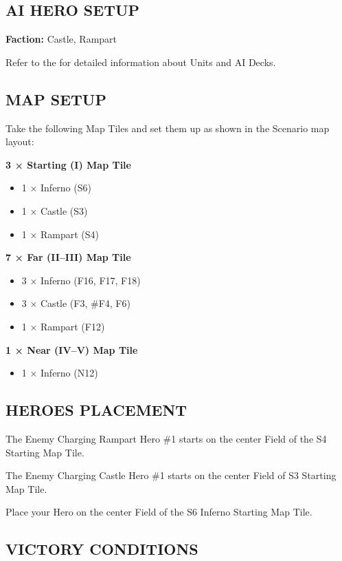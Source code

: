 \begin{multicols}{2}
\subsection*{\MakeUppercase{AI Hero Setup}}

\textbf{Faction:} Castle, Rampart

Refer to the  for detailed information about Units and AI Decks.

\subsection*{\MakeUppercase{Map Setup}}

Take the following Map Tiles and set them up as shown in the Scenario map layout:

\textbf{3 × Starting (I) Map Tile}
\begin{itemize}
  \item 1 × Inferno (S6)
  \item 1 × Castle (S3)
  \item 1 × Rampart (S4)
\end{itemize}

\textbf{7 × Far (II--III) Map Tile}
\begin{itemize}
  \item 3 × Inferno (F16, F17, F18)
  \item 3 × Castle (F3, \#F4, F6)
  \item 1 × Rampart (F12)
\end{itemize}

\textbf{1 × Near (IV--V) Map Tile}
\begin{itemize}
  \item 1 × Inferno (N12)
\end{itemize}

\subsection*{\MakeUppercase{Heroes Placement}}

The Enemy Charging Rampart Hero \#1 starts on the center Field of the S4 Starting Map Tile.

The Enemy Charging Castle Hero \#1 starts on the center Field of S3 Starting Map Tile.

Place your Hero on the center Field of the S6 Inferno Starting Map Tile.

\subsection*{\MakeUppercase{Victory Conditions}}


\end{multicols}
